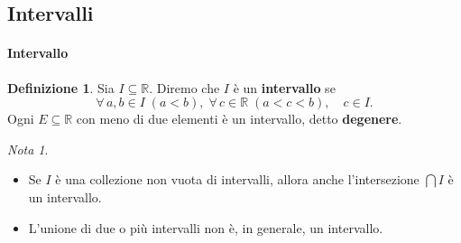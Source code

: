\documentclass{article}
\theoremstyle{plain}
\theoremstyle{definition}
\newtheorem{defn}{Definizione}[section]
\theoremstyle{remark}
\newtheorem{note}{Nota}
\begin{document}
\vspace{10pt}

\subsection{Intervalli}

\vspace{10pt}

\paragraph{Intervallo}
\begin{bxthm}
\begin{defn}
    Sia \(I \subseteq \mathbb{R}\). Diremo che \(I\) è un \textbf{intervallo} se
    \[\forall\,a,b\in I\;(a<b),\;\forall\,c\in\mathbb{R}\;(a<c<b),\quad c\in I.\]
    Ogni \(E \subseteq \mathbb{R}\) con meno di due elementi è un intervallo, detto \textbf{degenere}.
\end{defn}
\end{bxthm}

\vspace{10pt}

\begin{note}\hfill
    \begin{itemize}
        \item Se \(I\) è una collezione non vuota di intervalli, allora anche l'intersezione \(\bigcap I\) è un intervallo.
        \item L'unione di due o più intervalli non è, in generale, un intervallo.
    \end{itemize}
\end{note}

\vspace{10pt}
\end{document}
